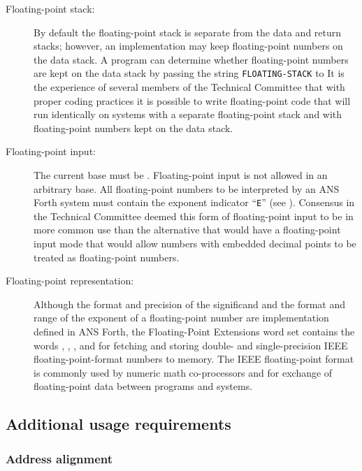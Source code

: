 \begin{description}
\item [Floating-point stack:]
	By default the floating-point stack is separate from the data
	and return stacks; however, an implementation may keep
	floating-point numbers on the data stack. A program can determine
	whether floating-point numbers are kept on the data stack by
	passing the string \linebreak \texttt{FLOATING-STACK} to 
	It is the experience of several members of the Technical Committee
	that with proper coding practices it is possible to write
	floating-point code that will run identically on systems with a
	separate floating-point stack and with floating-point numbers kept
	on the data stack.

\item[Floating-point input:]
	The current base must be . Floating-point input
	is not allowed in an arbitrary base. All floating-point numbers to
	be interpreted by an ANS Forth system must contain the exponent
	indicator ``\texttt{E}'' (see ). Consensus in the Technical
	Committee deemed this form of floating-point input to be in more
	common use than the alternative that would have a floating-point
	input mode that would allow numbers with embedded decimal points
	to be treated as floating-point numbers.

\item[Floating-point representation:]
	Although the format and precision of the significand and the format
	and range of the exponent of a floating-point number are
	implementation defined in ANS Forth, the Floating-Point Extensions
	word set contains the words
	, , , and 
	for fetching and storing double- and single-precision IEEE
	floating-point-format numbers to memory. The IEEE floating-point
	format is commonly used by numeric math co-processors and for
	exchange of floating-point data between programs and systems.
\end{description}

\setcounter{subsection}{2}
\subsection{Additional usage requirements} %

\setcounter{subsubsection}{4}
\subsubsection{Address alignment} %

